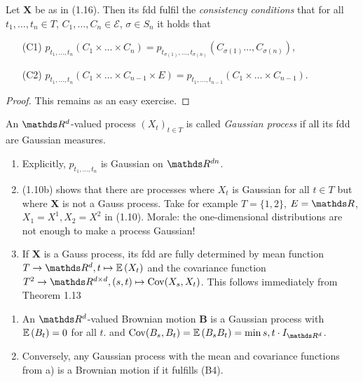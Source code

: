 \begin{prop}
Let $\textbf{X}$ be as in (1.16). Then its fdd fulfil the \emph{consistency conditions} that for all $t_1,\dots,t_n \in T$, $C_1,\dots,C_n \in \mathcal{E}$, $\sigma\in S_n$ it holds that
\begin{enumerate}
\item[(C1)] $p_{t_1,\dots ,t_n}(C_1\times \dots \times C_n)=p_{t_{\sigma(1)},\dots ,t_{\sigma(n)}}(C_{\sigma(1)}\dots ,C_{\sigma(n)})$,
\item[(C2)] $p_{t_1,\dots , t_n}(C_1\times \dots \times C_{n-1}\times E)=p_{t_1,\dots ,t_{n-1}}(C_1\times \dots \times C_{n-1})$.
\end{enumerate}
\begin{proof}
This remains as an easy exercise.
\end{proof}
\end{prop}

\begin{defi}
An $\Rd$-valued process $(X_t)_{t \in T}$ is called \emph{Gaussian process} if all its fdd are Gaussian measures.
\end{defi}

\begin{bem}
\begin{enumerate}[label=(\alph*)]
\item Explicitly, $p_{t_1,\dots , t_n}$ is Gaussian on $\R^{dn}$.
\item (1.10b) shows that there are processes where $X_t$ is Gaussian for all $t\in T$ but where $\textbf{X}$ is not a Gauss process. Take for example $T=\{1,2\}$, $E=\R$, $X_1=X^1,X_2=X^2$ in (1.10).
Morale: the one-dimensional distributions are not enough to make a process Gaussian!
\item If $\textbf{X}$ is a Gauss process, its fdd are fully determined by mean function $T \to \Rd, t \mapsto \E{X_t}$ and the covariance function $T^2\to \R^{d\times d}, (s,t) \mapsto \Cov(X_s,X_t)$.
This follows immediately from Theorem 1.13
\end{enumerate}
\end{bem}

\begin{thm}
\begin{enumerate}[label=(\alph*)]
\item An $\Rd$-valued Brownian motion $\textbf{B}$ is a Gaussian process with $\mathbb{E}\left(B_t\right)=0$ for all $t$.
and $\Cov(B_s,B_t)=\E{B_sB_t}=\min{s,t} \cdot I_{\Rd}$.
\item Conversely, any Gaussian process with the mean and covariance functions from a) is a Brownian motion if it fulfills (B4).
\end{enumerate}
\end{thm}
